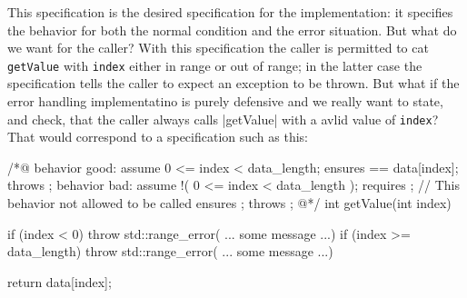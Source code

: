 This specification is the desired specification for the implementation: it specifies the behavior for both the normal condition and the error situation.  But what do we want for the caller? With this specification the caller is permitted to cat \lstinline|getValue| with \lstinline|index| either in range or out of range; in the latter case the specification tells the caller to expect an exception to be thrown. But what if the error handling implementatino is purely defensive and we really want to state, and check, that the caller
always calls \stinline|getValue| with a avlid value of \lstinline|index|? That would correspond to a specification such as this:

\begin{listing-nonumber}
    /*@ behavior good:
		  assume 0 <= index < data_length;
		  ensures \result == data[index];
		  throws \false;
        behavior bad:
		  assume !( 0 <= index < data_length );
		  requires \false;  // This behavior not allowed to be called
		  ensures \false;
		  throws \true;
@*/
int getValue(int index) {
	if (index < 0) throw std::range_error( ... some message ...)
	if (index >= data_length) throw std::range_error( ... some message ...)
	
	return data[index];
}
\end{listing-nonumber}

